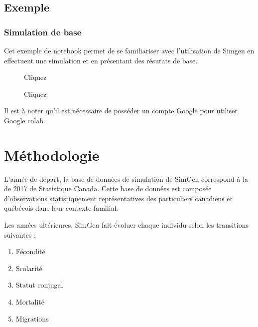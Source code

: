\documentclass[letterpaper,10pt,french]{sphinxmanual}
\begin{document}
\section{Exemple}
\label{\detokenize{utilisation:exemple}}

\subsection{Simulation de base}
\label{\detokenize{utilisation:simulation-de-base}}
Cet exemple de notebook permet de se familiariser avec l’utilisation de Simgen en effectuent une simulation
et en présentant des résutats de base.
\begin{description}
\item[{}] \leavevmode
Cliquez 

\item[{}] \leavevmode
Cliquez 

\end{description}

Il est à noter qu’il est nécessaire de posséder un compte Google pour utiliser Google colab.


\chapter{Méthodologie}
\label{\detokenize{methodologie:methodologie}}\label{\detokenize{methodologie:transition-models}}\label{\detokenize{methodologie::doc}}
L’année de départ, la base de données de simulation de SimGen correspond  à
la  de 2017 de Statistique Canada.
Cette base de données est composée
d’observations statistiquement représentatives des particuliers canadiens et québécois
dans leur contexte familial.

Les années ultérieures, SimGen fait évoluer chaque individu selon les transitions suivantes :
\begin{enumerate}
%
\item {} 
Fécondité

\item {} 
Scolarité

\item {} 
Statut conjugal

\item {} 
Mortalité

\item {} 
Migrations

\end{enumerate}
\end{document}
